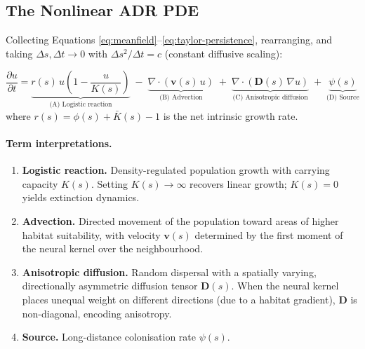 \documentclass[12pt,a4paper]{article}
\theoremstyle{definition}
\begin{document}
\subsection{The Nonlinear ADR PDE}

Collecting Equations \eqref{eq:meanfield}--\eqref{eq:taylor-persistence},
rearranging, and taking $\Delta s, \Delta t \to 0$ with $\Delta s^2/\Delta t = c$
(constant diffusive scaling):

\begin{keybox}
\begin{equation}
  \frac{\partial u}{\partial t}
  =
  \underbrace{r(s)\, u\!\left(1 - \frac{u}{K(s)}\right)}_{\displaystyle\text{(A) Logistic reaction}}
  \;-\;
  \underbrace{\nabla \cdot \!\left(\mathbf{v}(s)\, u\right)}_{\displaystyle\text{(B) Advection}}
  \;+\;
  \underbrace{\nabla \cdot \!\left(\mathbf{D}(s)\, \nabla u\right)}_{\displaystyle\text{(C) Anisotropic diffusion}}
  \;+\;
  \underbrace{\psi(s)}_{\displaystyle\text{(D) Source}}
  \label{eq:adr}
\end{equation}
where $r(s) = \phi(s) + \bar{K}(s) - 1$ is the net intrinsic growth rate.
\end{keybox}

\paragraph{Term interpretations.}

\begin{enumerate}[label=(\Alph*)]
  \item \textbf{Logistic reaction.}  Density-regulated population growth with
    carrying capacity $K(s)$.  Setting $K(s)\to\infty$ recovers linear
    growth; $K(s)=0$ yields extinction dynamics.

  \item \textbf{Advection.}  Directed movement of the population toward areas
    of higher habitat suitability, with velocity $\mathbf{v}(s)$ determined by
    the first moment of the neural kernel over the neighbourhood.

  \item \textbf{Anisotropic diffusion.}  Random dispersal with a spatially
    varying, directionally asymmetric diffusion tensor $\mathbf{D}(s)$.  When
    the neural kernel places unequal weight on different directions (due to a
    habitat gradient), $\mathbf{D}$ is non-diagonal, encoding anisotropy.

  \item \textbf{Source.}  Long-distance colonisation rate $\psi(s)$.
\end{enumerate}
\end{document}
